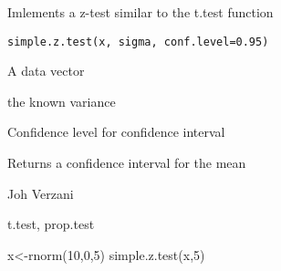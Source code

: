 \begin{Description}\relax
Imlements a z-test similar to the t.test function
\end{Description}
\begin{Usage}
\begin{verbatim}
simple.z.test(x, sigma, conf.level=0.95)
\end{verbatim}
\end{Usage}
\begin{Arguments}
\begin{ldescription}
\item[\code{x}] A data vector 
\item[\code{sigma}] the known variance 
\item[\code{conf.level}] Confidence level for confidence interval 
\end{ldescription}
\end{Arguments}
\begin{Value}
Returns a confidence interval for the mean
\end{Value}
\begin{Author}\relax
Joh Verzani
\end{Author}
\begin{SeeAlso}\relax
t.test, prop.test
\end{SeeAlso}
\begin{Examples}
\begin{ExampleCode}
  x<-rnorm(10,0,5)
  simple.z.test(x,5)
\end{ExampleCode}
\end{Examples}

